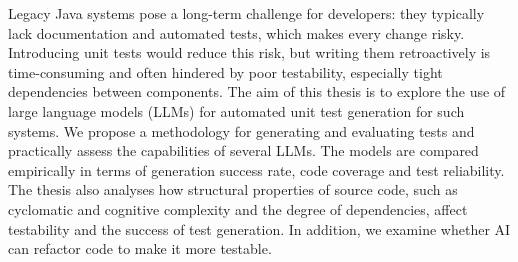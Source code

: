 Legacy Java systems pose a long-term challenge for developers: they typically lack documentation and automated tests, which makes every change risky.
 Introducing unit tests would reduce this risk, but writing them retroactively is time-consuming and often hindered by poor testability, especially tight dependencies between components. 
 The aim of this thesis is to explore the use of large language models (LLMs) for automated unit test generation for such systems.
  We propose a methodology for generating and evaluating tests and practically assess the capabilities of several LLMs. 
  The models are compared empirically in terms of generation success rate, code coverage and test reliability.
   The thesis also analyses how structural properties of source code, such as cyclomatic and cognitive complexity and the degree of dependencies, affect testability and the success of test generation. 
   In addition, we examine whether AI can refactor code to make it more testable.
